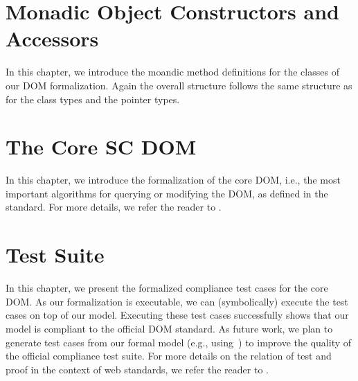 \documentclass[10pt,DIV16,a4paper,abstract=true,twoside=semi,openright]
{scrreprt}
\begin{document}
\chapter{Monadic Object Constructors and Accessors}
\label{cha:monads}
In this chapter, we introduce the moandic method definitions for the
classes of our DOM formalization. Again the overall structure follows
the same structure as for the class types and the pointer types.







\chapter{The Core SC DOM}
\label{cha:dom}
In this chapter, we introduce the formalization of the core DOM, i.e.,
the most important algorithms for querying or modifying the DOM, as
defined in the standard. For more details, we refer the reader to
\cite{brucker.ea:core-dom:2018}.





\chapter{Test Suite}
\label{cha:tests}
In this chapter, we present the formalized compliance test cases for
the core DOM. As our formalization is executable, we can
(symbolically) execute the test cases on top of our model. Executing
these test cases successfully shows that our model is compliant to the
official DOM standard. As future work, we plan to generate test cases
from our formal model (e.g.,
using~\cite{brucker.ea:interactive:2005,brucker.ea:theorem-prover:2012})
to improve the quality of the official compliance test suite. For more
details on the relation of test and proof in the context of web
standards, we refer the reader to
\cite{brucker.ea:standard-compliance-testing:2018}.
 
 
 

{\small
  
  
}
\end{document}
